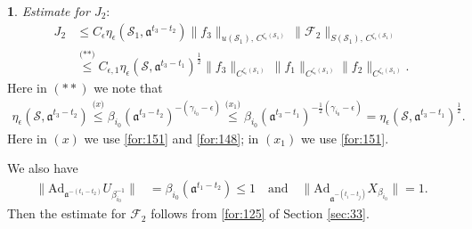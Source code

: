 \documentclass[11 pt]{amsart}
\newcommand{\norm}[1]{\lVert#1\rVert}
\theoremstyle{definition}
\newtheorem{sect}{}
\numberwithin{equation}{section}
\begin{document}
\begin{sect} \emph{Estimate for $J_2$}:
\begin{align*}
  J_2&\leq C_\epsilon \eta_{\epsilon}(\mathcal{S}_1, \mathfrak{a}^{t_{3}-t_{ 2}})\norm{f_3}_{u(\mathcal{S}_1),\,C^{\zeta_\epsilon(\mathcal{S}_1)}}\,\big\|\mathcal{F}_2\big\|_{S(\mathcal{S}_1),\,C^{\zeta_\epsilon(\mathcal{S}_1)}}\\
 &\overset{\text{(**)}}{\leq}C_{\epsilon,1} \eta_{\epsilon} (\mathcal{S}, \mathfrak{a}^{t_3-t_{1}})^{\frac{1}{2}}\norm{f_3}_{C^{\zeta_\epsilon(\mathcal{S}_1)}}\,\big\|f_1\big\|_{C^{\zeta_\epsilon(\mathcal{S}_1)}}
 \big\|f_2\big\|_{C^{\zeta_\epsilon(\mathcal{S}_1)}}.
\end{align*}
Here in $(**)$ we note that
\begin{align*}
   \eta_{\epsilon} (\mathcal{S}, \mathfrak{a}^{t_3-t_{2}})\overset{\text{($x$)}}{\leq}\beta_{i_0}(\mathfrak{a}^{t_3-t_{2}})^{-(\gamma_{i_0}-\epsilon)}
   \overset{\text{($x_1$)}}{\leq}\beta_{i_0}(\mathfrak{a}^{t_3-t_{1}})^{-\frac{1}{2}(\gamma_{i_0}-\epsilon)}= \eta_{\epsilon} (\mathcal{S}, \mathfrak{a}^{t_3-t_{1}})^{\frac{1}{2}}.
  \end{align*}
Here in $(x)$ we use \eqref{for:151} and \eqref{for:148}; in $(x_1)$ we use \eqref{for:151}.




  We also have
  \begin{align*}
 \|\text{Ad}_{\mathfrak{a}^{-(t_{1}-t_{2})}}U_{\beta_{i_0}^{-1}}\|&=\beta_{i_0}(\mathfrak{a}^{t_{1}-t_{ 2}})\leq1\quad\text{and}\quad\|\text{Ad}_{\mathfrak{a}^{-(t_{i}-t_{ j})}}X_{\beta_{i_0}}\|=1.
\end{align*}
  Then the estimate for $\mathcal{F}_2$ follows from \eqref{for:125} of Section \ref{sec:33}.
\end{sect}
\end{document}
